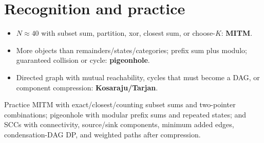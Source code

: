 \section{Recognition and practice}
\begin{itemize}
\item $N \approx 40$ with subset sum, partition, xor, closest sum, or choose-$K$: \textbf{MITM}.
\item More objects than remainders/states/categories; prefix sum plus modulo; guaranteed collision or cycle: \textbf{pigeonhole}.
\item Directed graph with mutual reachability, cycles that must become a DAG, or component compression: \textbf{Kosaraju/Tarjan}. 
\end{itemize}

Practice MITM with exact/closest/counting subset sums and two-pointer combinations; pigeonhole with modular prefix sums and repeated states; and SCCs with connectivity, source/sink components, minimum added edges, condensation-DAG DP, and weighted paths after compression.
